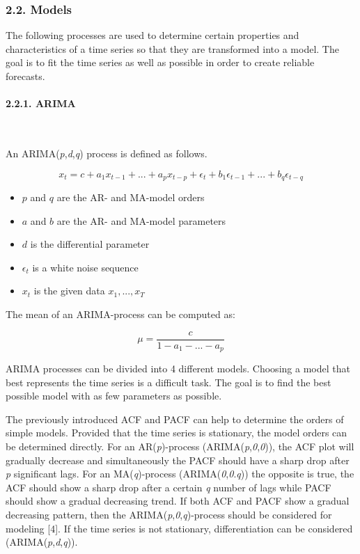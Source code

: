 \documentclass[
]{article}
\providecommand{\tightlist}{%
  \setlength{\itemsep}{0pt}\setlength{\parskip}{0pt}}
\begin{document}
\newpage

\hypertarget{models-section}{%
\subsubsection{2.2. Models}\label{models-section}}

The following processes are used to determine certain properties and
characteristics of a time series so that they are transformed into a
model. The goal is to fit the time series as well as possible in order
to create reliable forecasts.

\hypertarget{arima}{%
\paragraph{2.2.1. ARIMA}\label{arima}}

~

An ARIMA(\emph{p},\emph{d},\emph{q}) process is defined as follows.

\begin{equation} \label{eq:arima}
  x_{t}=c+a_{1}x_{t-1}+...+a_{p}x_{t-p}+\epsilon_{t}+b_{1}\epsilon_{t-1}+...+b_{q}\epsilon_{t-q}
\end{equation}

\begin{itemize}
\tightlist
\item
  \(p\) and \(q\) are the AR- and MA-model orders
\item
  \(a\) and \(b\) are the AR- and MA-model parameters
\item
  \(d\) is the differential parameter
\item
  \(\epsilon_t\) is a white noise sequence
\item
  \(x_t\) is the given data \(x_{1},...,x_{T}\)
\end{itemize}

The mean of an ARIMA-process can be computed as:

\[\mu=\frac{c}{1-a_{1}-...-a_{p}}\]

ARIMA processes can be divided into 4 different models. Choosing a model
that best represents the time series is a difficult task. The goal is to
find the best possible model with as few parameters as possible.

The previously introduced ACF and PACF can help to determine the orders
of simple models. Provided that the time series is stationary, the model
orders can be determined directly. For an AR(\emph{p})-process
(ARIMA(\emph{p},\emph{0},\emph{0})), the ACF plot will gradually
decrease and simultaneously the PACF should have a sharp drop after
\emph{p} significant lags. For an MA(\emph{q})-process
(ARIMA(\emph{0},\emph{0}.\emph{q})) the opposite is true, the ACF should
show a sharp drop after a certain \emph{q} number of lags while PACF
should show a gradual decreasing trend. If both ACF and PACF show a
gradual decreasing pattern, then the
ARIMA(\emph{p},\emph{0},\emph{q})-process should be considered for
modeling {[}4{]}. If the time series is not stationary, differentiation
can be considered (ARIMA(\emph{p},\emph{d},\emph{q})).
\end{document}

